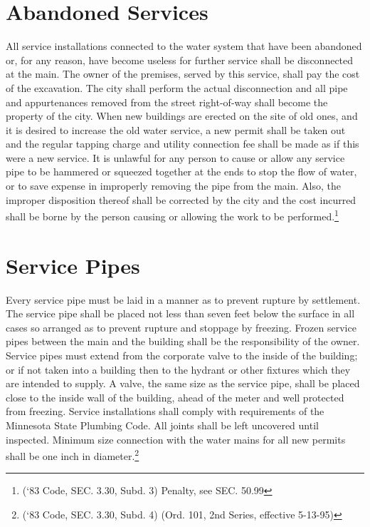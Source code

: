 \section{Abandoned Services}
All service installations connected to the water system that have been abandoned or, for any reason, have become useless for further service shall be disconnected at the main.  The owner of the premises, served by this service, shall pay the cost of the excavation.  The city shall perform the actual disconnection and all pipe and appurtenances removed from the street right-of-way shall become the property of the city.  When new buildings are erected on the site of old ones, and it is desired to increase the old water service, a new permit shall be taken out and the regular tapping charge and utility connection fee shall be made as if this were a new service.  It is unlawful for any person to cause or allow any service pipe to be hammered or squeezed together at the ends to stop the flow of water, or to save expense in improperly removing the pipe from the main.  Also, the improper disposition thereof shall be corrected by the city and the cost incurred shall be borne by the person causing or allowing the work to be performed.\footnote{(‘83 Code, SEC. 3.30, Subd. 3)  Penalty, see SEC. 50.99}

\section{Service Pipes}
Every service pipe must be laid in a manner as to prevent rupture by settlement.  The service pipe shall be placed not less than seven feet below the surface in all cases so arranged as to prevent rupture and stoppage by freezing.  Frozen service pipes between the main and the building shall be the responsibility of the owner.  Service pipes must extend from the corporate valve to the inside of the building; or if not taken into a building then to the hydrant or other fixtures which they are intended to supply.  A valve, the same size as the service pipe, shall be placed close to the inside wall of the building, ahead of the meter and well protected from freezing.  Service installations shall comply with requirements of the Minnesota State Plumbing Code.  All joints shall be left uncovered until inspected.  Minimum size connection with the water mains for all new permits shall be one inch in diameter.\footnote{(‘83 Code, SEC. 3.30, Subd. 4) (Ord. 101, 2nd Series, effective 5-13-95)}

